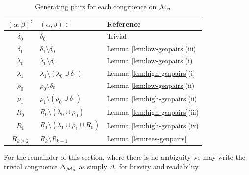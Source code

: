 \begin{table}[ht]
  \renewcommand\arraystretch{1.0}
  \centering
  \begin{tabular}{| c | l | l |}
    \hline
    $(\alpha,\beta)^\sharp$ & $(\alpha,\beta) \in$ & Reference \\
    \hline
    $\delta_0$   & $\delta_0$
                 & Trivial                             \\
    $\delta_1$   & $\delta_1 \setminus \delta_0$
                 & Lemma \ref{lem:low-genpairs}(iii)  \\
    $\lambda_0$  & $\lambda_0 \setminus \delta_0$
                 & Lemma \ref{lem:low-genpairs}(i)    \\
    $\lambda_1$  & $\lambda_1 \setminus (\lambda_0 \cup \delta_1)$
                 & Lemma \ref{lem:high-genpairs}(i)   \\
    $\rho_0$     & $\rho_0 \setminus \delta_0$
                 & Lemma \ref{lem:low-genpairs}(ii)   \\
    $\rho_1$     & $\rho_1 \setminus (\rho_0 \cup \delta_1)$
                 & Lemma \ref{lem:high-genpairs}(ii)  \\
    $R_0$        & $R_0 \setminus (\lambda_0 \cup \rho_0)$
                 & Lemma \ref{lem:high-genpairs}(iii) \\
    $R_1$        & $R_1 \setminus (\lambda_1 \cup \rho_1 \cup R_0)$
                 & Lemma \ref{lem:high-genpairs}(iv)  \\
    $R_{k \geq 2}$ & $R_k \setminus R_{k-1}$
                 & Lemma \ref{lem:rees-genpairs}       \\
    \hline
  \end{tabular}
  \caption{Generating pairs for each congruence on $\mathcal{M}_n$}
  \label{tab:mn-genpairs}
\end{table}

For the remainder of this section, where there is no ambiguity we may write the
trivial congruence $\Delta_{\mathcal{M}_n}$ as simply $\Delta$, for brevity and
readability.

